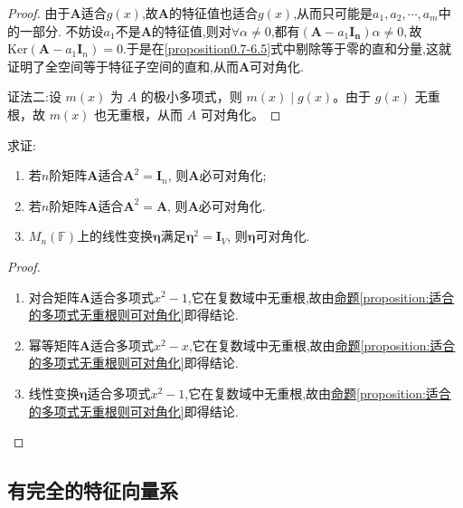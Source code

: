 \documentclass[../../main.tex]{subfiles}
\begin{document}
\begin{proof}
由于\(\boldsymbol{A}\)适合\(g(x)\),故\(\boldsymbol{A}\)的特征值也适合\(g(x)\),从而只可能是\(a_1,a_2,\cdots,a_m\)中的一部分. 
不妨设$a_1$不是$\boldsymbol{A}$的特征值,则对$\forall \alpha\ne 0$,都有$(\boldsymbol{A}-a_1\boldsymbol{I_n})\alpha \ne 0,$故$\mathrm{Ker}(\boldsymbol{A} - a_1\boldsymbol{I}_n)=0$.于是在\eqref{proposition0.7-6.5}式中剔除等于零的直和分量,这就证明了全空间等于特征子空间的直和,从而\(\boldsymbol{A}\)可对角化.

{\color{blue}证法二:}设 $m(x)$ 为 $A$ 的极小多项式，则 $m(x)\mid g(x)$。由于 $g(x)$ 无重根，故 $m(x)$ 也无重根，从而 $A$ 可对角化。
\end{proof}

\begin{example}\label{example0.7qew}
求证:
\begin{enumerate}[(1)]
\item 若\(n\)阶矩阵\(\boldsymbol{A}\)适合\(\boldsymbol{A}^2 = \boldsymbol{I}_n\), 则\(\boldsymbol{A}\)必可对角化;

\item 若\(n\)阶矩阵\(\boldsymbol{A}\)适合\(\boldsymbol{A}^2 = \boldsymbol{A}\), 则\(\boldsymbol{A}\)必可对角化.

\item \(M_n(\mathbb{F})\)上的线性变换\(\boldsymbol{\eta}\)满足\(\boldsymbol{\eta}^2 = \boldsymbol{I}_V\), 则\(\boldsymbol{\eta}\)可对角化.
\end{enumerate}
\end{example}
\begin{proof}
\begin{enumerate}[(1)]
\item 对合矩阵\(\boldsymbol{A}\)适合多项式\(x^2 - 1\),它在复数域中无重根,故由\hyperref[proposition:适合的多项式无重根则可对角化]{命题\ref{proposition:适合的多项式无重根则可对角化}}即得结论.

\item 幂等矩阵\(\boldsymbol{A}\)适合多项式\(x^2 - x\),它在复数域中无重根,故由\hyperref[proposition:适合的多项式无重根则可对角化]{命题\ref{proposition:适合的多项式无重根则可对角化}}即得结论.

\item 线性变换\(\boldsymbol{\eta}\)适合多项式$x^2-1$,它在复数域中无重根,故由\hyperref[proposition:适合的多项式无重根则可对角化]{命题\ref{proposition:适合的多项式无重根则可对角化}}即得结论.
\end{enumerate}
\end{proof}


\subsection{有完全的特征向量系}
\end{document}
